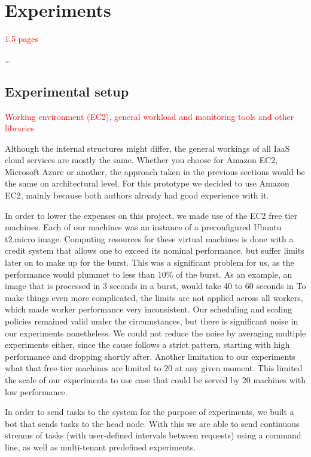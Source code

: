 \documentclass{stylesheet}
\begin{document}
\section{Experiments}
\label{sec:experiments}
\textcolor{red}{1.5 pages}

\ldots

\subsection{Experimental setup}
\label{subsec:setup}
\textcolor{red}{Working environment (EC2), general workload and monitoring tools and other libraries}

Although the internal structures might differ, the general workings of all IaaS cloud services are mostly the same. Whether you choose for Amazon EC2, Microsoft Azure or another, the approach taken in the previous sections would be the same on architectural level. For this prototype we decided to use Amazon EC2, mainly because both authors already had good experience with it.

In order to lower the expenses on this project, we made use of the EC2 free tier machines. Each of our machines was an instance of a preconfigured Ubuntu t2.micro image. Computing resources for these virtual machines is done with a credit system that allows one to exceed its nominal performance, but suffer limits later on to make up for the burst. This was a significant problem for us, as the performance would plummet to less than 10\% of the burst. As an example, an image that is processed in 3 seconds in a burst, would take 40 to 60 seconds in  To make things even more complicated, the limits are not applied across all workers, which made worker performance very inconsistent. Our scheduling and scaling policies remained valid under the circumstances, but there is significant noise in our experiments nonetheless. We could not reduce the noise by averaging multiple experiments either, since the cause follows a strict pattern, starting with high performance and dropping shortly after. Another limitation to our experiments what that free-tier machines are limited to 20 at any given moment. This limited the scale of our experiments to use case that could be served by 20 machines with low performance.

In order to send tasks to the system for the purpose of experiments, we built a bot that sends tasks to the head node. With this we are able to send continuous streams of tasks (with user-defined intervals between requests) using a command line, as well as multi-tenant predefined experiments. 
\end{document}
